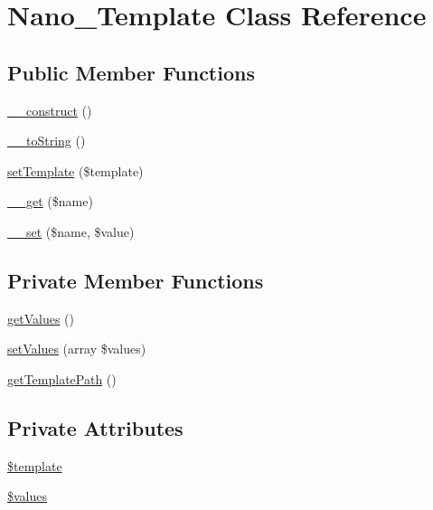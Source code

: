 \hypertarget{classNano__Template}{
\section{Nano\_\-Template Class Reference}
\label{classNano__Template}
}
\subsection*{Public Member Functions}
\begin{CompactItemize}
\item 
\hyperlink{classNano__Template_7e846712272099c6acd6783a48cdad39}{\_\-\_\-construct} ()
\item 
\hyperlink{classNano__Template_511c55a01e2e3775ed2da95da94b6dfd}{\_\-\_\-toString} ()
\item 
\hyperlink{classNano__Template_1f42e53e3a72f2fefe403a44335cfd3a}{setTemplate} (\$template)
\item 
\hyperlink{classNano__Template_e27a9fd6e4e2c0d289fccdc3f40a7b99}{\_\-\_\-get} (\$name)
\item 
\hyperlink{classNano__Template_a9201426bd79ac9b6f25b7f9fc943ca9}{\_\-\_\-set} (\$name, \$value)
\end{CompactItemize}
\subsection*{Private Member Functions}
\begin{CompactItemize}
\item 
\hyperlink{classNano__Template_5f8366e2e67ea058706d14e354ddeea8}{getValues} ()
\item 
\hyperlink{classNano__Template_bc0522f6bf3de8c77bd294f27652e930}{setValues} (array \$values)
\item 
\hyperlink{classNano__Template_f06289717ba74b1fc438efd3689e6bca}{getTemplatePath} ()
\end{CompactItemize}
\subsection*{Private Attributes}
\begin{CompactItemize}
\item 
\hyperlink{classNano__Template_4ba7e9617808030dd65b5c2b5aba24a7}{\$template}
\item 
\hyperlink{classNano__Template_8f485b6c95c2aa9b105654950ef1a45d}{\$values}
\end{CompactItemize}


